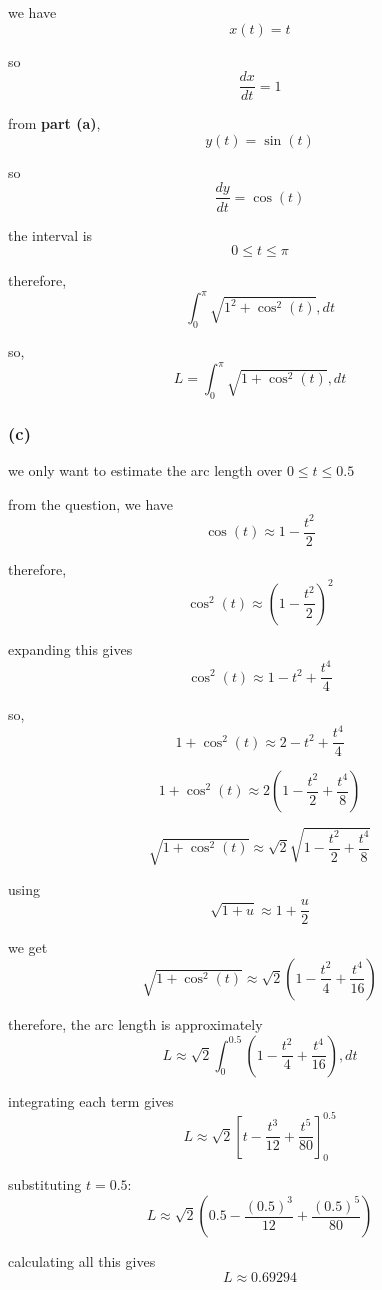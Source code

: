 \documentclass{article}
\begin{document}
we have
\[
x(t)=t
\]

so
\[
\frac{dx}{dt}=1
\]

from \textbf{part (a)},
\[
y(t)=\sin(t)
\]

so
\[
\frac{dy}{dt}=\cos(t)
\]

the interval is
\[
0\leq t\leq\pi
\]

therefore,
\[
\int_0^\pi \sqrt{1^2+\cos^2(t)},dt
\]

so,
\[
\boxed{
L=\int_0^\pi\sqrt{1+\cos^2(t)},dt
}
\]

\subsubsection*{(c)}
we only want to estimate the arc length over $0\leq t\leq0.5$

from the question, we have
\[
\cos(t)\approx1-\frac{t^2}{2}
\]

therefore,
\[
\cos^2(t) \approx \left(1-\frac{t^2}{2}\right)^2
\]

expanding this gives
\[
\cos^2(t) \approx 1-t^2+\frac{t^4}{4}
\]

so,
\[
1+\cos^2(t) \approx 2-t^2+\frac{t^4}{4}
\]

\[
1+\cos^2(t) \approx 2\left(1-\frac{t^2}{2}+\frac{t^4}{8}\right)
\]

\[
\sqrt{1+\cos^2(t)} \approx \sqrt2 \sqrt{1-\frac{t^2}{2}+\frac{t^4}{8}}
\]

using
\[
\sqrt{1+u}\approx1+\frac{u}{2}
\]

we get
\[
\sqrt{1+\cos^2(t)} \approx \sqrt2 \left(1-\frac{t^2}{4}+\frac{t^4}{16}\right)
\]

therefore, the arc length is approximately
\[
L \approx \sqrt2\int_0^{0.5}\left(1-\frac{t^2}{4}+\frac{t^4}{16}\right),dt
\]

integrating each term gives
\[
L \approx \sqrt2 \left[t-\frac{t^3}{12}+\frac{t^5}{80}\right]_0^{0.5}
\]

substituting $t=0.5$:
\[
L \approx \sqrt2\left(0.5-\frac{(0.5)^3}{12} + \frac{(0.5)^5}{80}\right)
\]

calculating all this gives
\[
\boxed{L\approx0.69294}
\]
\end{document}
